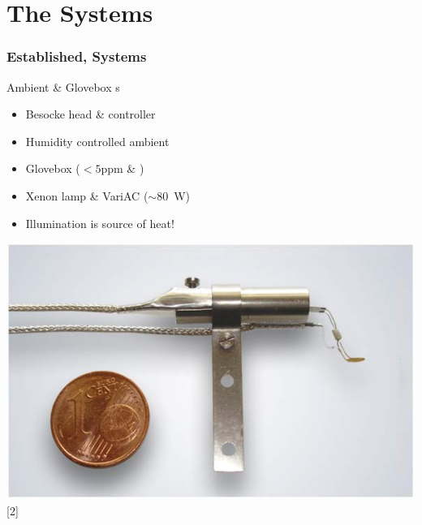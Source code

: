 \documentclass{beamer}
\begin{document}
\section{The Systems}
\begin{frame}
\frametitle{Established,  \kp{} Systems}
\begin{block}{Ambient \& Glovebox \kp{}s}
\centering
\begin{minipage}{0.55\linewidth}
\centering
\begin{itemize}
	\item Besocke \kp{} head \& controller
	\item Humidity controlled ambient
	\item Glovebox ($<\num{5}$ppm \oxy{} \& \water{})
	\item Xenon lamp \& VariAC ($\sim$\SI{80}{\watt})
	\item Illumination is source of heat!
\end{itemize}
\end{minipage}
\hfill
\begin{minipage}{0.4\linewidth}
\centering
	\includegraphics[width=1\linewidth]{./figs/pres/besocke}\\
	\textcolor{RUred}{[2]}
\end{minipage}
\end{block}\end{frame}
\end{document}
